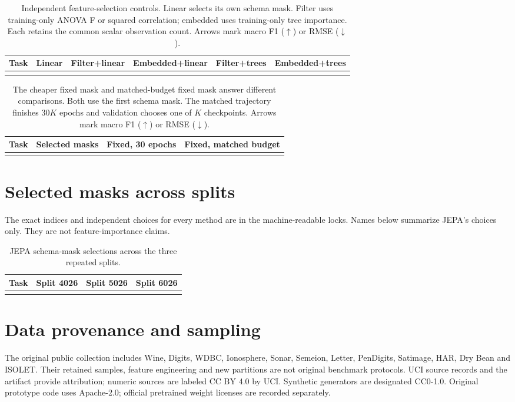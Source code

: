 \documentclass{article}
\begin{document}
\begin{table}[h]
\caption{Independent feature-selection controls. Linear selects its own schema mask. Filter uses training-only ANOVA F or squared correlation; embedded uses training-only tree importance. Each retains the common scalar observation count. Arrows mark macro F1 ($\uparrow$) or RMSE ($\downarrow$).}
\centering\scriptsize
\begin{tabular}{lccccc}\toprule
Task & Linear & Filter+linear & Embedded+linear & Filter+trees & Embedded+trees\\\midrule
\\\bottomrule
\end{tabular}
\end{table}
\FloatBarrier
\begin{table}[h]
\caption{The cheaper fixed mask and matched-budget fixed mask answer different comparisons. Both use the first schema mask. The matched trajectory finishes $30K$ epochs and validation chooses one of $K$ checkpoints. Arrows mark macro F1 ($\uparrow$) or RMSE ($\downarrow$).}
\centering\small
\begin{tabular}{lccc}\toprule
Task & Selected masks & Fixed, 30 epochs & Fixed, matched budget\\\midrule
\\\bottomrule
\end{tabular}
\end{table}
\FloatBarrier

\section{Selected masks across splits}\label{app:masks}
The exact indices and independent choices for every method are in the machine-readable locks. Names below summarize JEPA's choices only. They are not feature-importance claims.
\begin{table}[h]
\caption{JEPA schema-mask selections across the three repeated splits.}\centering\scriptsize
\begin{tabular}{llll}\toprule
Task & Split 4026 & Split 5026 & Split 6026\\\midrule
\\\bottomrule
\end{tabular}
\end{table}
\FloatBarrier

\section{Data provenance and sampling}\label{app:data}
The original public collection includes Wine, Digits, WDBC, Ionosphere, Sonar, Semeion, Letter, PenDigits, Satimage, HAR, Dry Bean and ISOLET. Their retained samples, feature engineering and new partitions are not original benchmark protocols. UCI source records and the artifact provide attribution; numeric sources are labeled CC BY 4.0 by UCI. Synthetic generators are designated CC0-1.0. Original prototype code uses Apache-2.0; official pretrained weight licenses are recorded separately.
\end{document}

